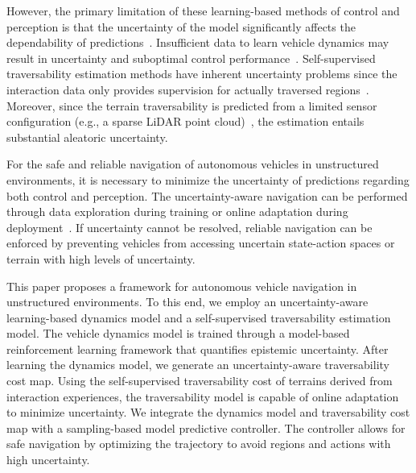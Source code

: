 However, the primary limitation of these learning-based methods of control and perception is that the uncertainty of the model significantly affects the dependability of predictions~\cite{nguyen-tuong_model_2011,palazzo2020domain,fan2021learning,cai2022risk,seo_scate_2023}. Insufficient data to learn vehicle dynamics may result in uncertainty and suboptimal control performance~\cite{kahn_uncertainty-aware_2017,parsi_active_2020}. Self-supervised traversability estimation methods have inherent uncertainty problems since the interaction data only provides supervision for actually traversed regions~\cite{Wellhausen_2020,seo_scate_2023,frey2023fast}. Moreover, since the terrain traversability is predicted from a limited sensor configuration (e.g., a sparse LiDAR point cloud)~\cite{fei2021pillarsegnet,cheng2021s3cnet,han2021planning,peng2022mass,shaban2022semantic}, the estimation entails substantial aleatoric uncertainty.

For the safe and reliable navigation of autonomous vehicles in unstructured environments, it is necessary to minimize the uncertainty of predictions regarding both control and perception. The uncertainty-aware navigation can be performed through data exploration during training or online adaptation during deployment~\cite{nagabandilearning, BanerjeeHarrisonEtAl2020,RichardsAzizanEtAl2021, visca2022Meta}. If uncertainty cannot be resolved, reliable navigation can be enforced by preventing vehicles from accessing uncertain state-action spaces or terrain with high levels of uncertainty.

This paper proposes a framework for autonomous vehicle navigation in unstructured environments. To this end, we employ an uncertainty-aware learning-based dynamics model and a self-supervised traversability estimation model. The vehicle dynamics model is trained through a model-based reinforcement learning framework that quantifies epistemic uncertainty. After learning the dynamics model, we generate an uncertainty-aware traversability cost map. Using the self-supervised traversability cost of terrains derived from interaction experiences, the traversability model is capable of online adaptation to minimize uncertainty. We integrate the dynamics model and traversability cost map with a sampling-based model predictive controller. The controller allows for safe navigation by optimizing the trajectory to avoid regions and actions with high uncertainty.
